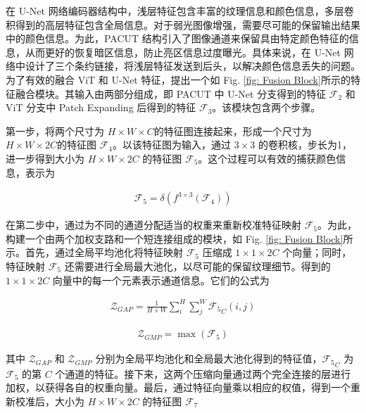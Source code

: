 \documentclass[a4paper, 10pt]{article}
\begin{document}
		在 U-Net 网络编码器结构中，浅层特征包含丰富的纹理信息和颜色信息，多层卷积得到的高层特征包含全局信息。对于弱光图像增强，需要尽可能的保留输出结果中的颜色信息。为此，PACUT 结构引入了图像通道来保留具由特定颜色特征的信息，从而更好的恢复暗区信息，防止亮区信息过度曝光。具体来说，在 U-Net 网络中设计了三个条约链接，将浅层特征发送到后头，以解决颜色信息丢失的问题。为了有效的融合 ViT 和 U-Net 特征，提出一个如 Fig. \ref{fig: Fusion Block}所示的特征融合模块。其输入由两部分组成，即 PACUT 中 U-Net 分支得到的特征 $\mathcal{F_2}$ 和 ViT 分支中 Patch Expanding 后得到的特征 $\mathcal{F_3}$。该模块包含两个步骤。
		
		第一步，将两个尺寸为 $H \times W \times C$的特征图连接起来，形成一个尺寸为 $H \times W \times 2C$的特征图 $\mathcal{F}_4$。以该特征图为输入，通过 $3 \times 3$ 的卷积核，步长为1，进一步得到大小为 $H \times W \times 2C$ 的特征图 $\mathcal{F}_5$。这个过程可以有效的捕获颜色信息，表示为 
		
		\begin{equation}
			\begin{aligned}
				\mathcal{F}_5 = \delta \left( f^{3 \times 3} (\mathcal{F}_4)\right)
			\end{aligned}
			\label{eq: capture color information}
		\end{equation}
		
		在第二步中，通过为不同的通道分配适当的权重来重新校准特征映射 $\mathcal{F}_5$。为此，构建一个由两个加权支路和一个短连接组成的模块，如 Fig. \ref{fig: Fusion Block}所示。首先，通过全局平均池化将特征映射 $\mathcal{F}_5$ 压缩成 $1 \times 1 \times 2C$ 个向量；同时，特征映射 $\mathcal{F}_5$ 还需要进行全局最大池化，以尽可能的保留纹理细节。得到的 $1 \times 1 \times 2C$ 向量中的每一个元素表示通道信息。它们的公式为
		
		\begin{equation}
			\begin{aligned}
				\mathcal{Z}_{GAP} = \frac{1}{H \times W} \sum_{i}^{H} \sum_{j}^{W} {\mathcal{F}_5}_C (i,j)
			\end{aligned}
			\label{eq: avgpool}
		\end{equation}
		
		\begin{equation}
			\begin{aligned}
				\mathcal{Z}_{GMP} = \max \left( \mathcal{F}_5 \right)
			\end{aligned}
			\label{eq: maxpool}
		\end{equation}
		
		其中 $\mathcal{Z}_{GAP}$ 和 $\mathcal{Z}_{GMP}$ 分别为全局平均池化和全局最大池化得到的特征值，${\mathcal{F}_5}_C$ 为 $\mathcal{F}_5$ 的第 $C$ 个通道的特征。接下来，这两个压缩向量通过两个完全连接的层进行加权，以获得各自的权重向量。最后，通过特征向量乘以相应的权值，得到一个重新校准后，大小为 $H \times W \times 2C$ 的特征图 $\mathcal{F}_7$
		
\end{document}
